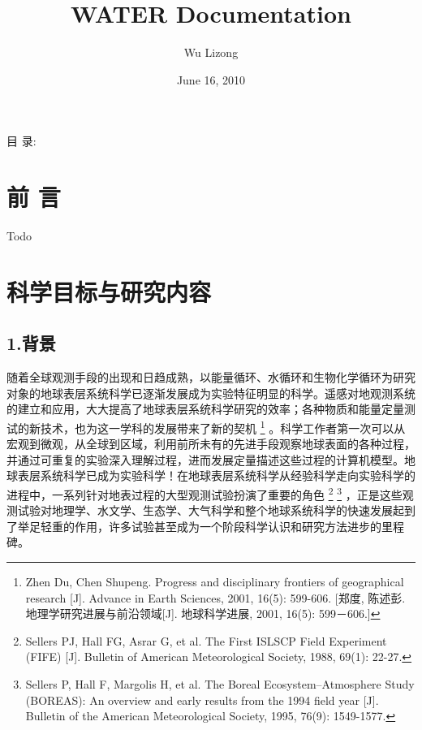 \documentclass[letterpaper,10pt,english]{sphinxmanual}
\title{WATER Documentation}
\date{June 16, 2010}
\author{Wu Lizong}
\begin{document}
\maketitle
\tableofcontents
{}\label{index::doc}


目 录:


\chapter{前  言}
\label{foreword::doc}\label{foreword:foreword}\label{foreword:id1}
Todo


\chapter{科学目标与研究内容}
\label{water_aims:doc-aims}\label{water_aims::doc}\label{water_aims:id1}

\section{1.背景}
\label{water_aims:id2}
随着全球观测手段的出现和日趋成熟，以能量循环、水循环和生物化学循环为研究对象的地球表层系统科学已逐渐发展成为实验特征明显的科学。遥感对地观测系统的建立和应用，大大提高了地球表层系统科学研究的效率；各种物质和能量定量测试的新技术，也为这一学科的发展带来了新的契机 \footnote{
Zhen Du, Chen Shupeng. Progress and disciplinary frontiers of geographical research {[}J{]}. Advance in Earth Sciences, 2001, 16(5): 599-606. {[}郑度, 陈述彭. 地理学研究进展与前沿领域{[}J{]}. 地球科学进展, 2001, 16(5): 599－606.{]}
} 。科学工作者第一次可以从宏观到微观，从全球到区域，利用前所未有的先进手段观察地球表面的各种过程，并通过可重复的实验深入理解过程，进而发展定量描述这些过程的计算机模型。地球表层系统科学已成为实验科学！在地球表层系统科学从经验科学走向实验科学的进程中，一系列针对地表过程的大型观测试验扮演了重要的角色 \footnote{
Sellers PJ, Hall FG, Asrar G, et al. The First ISLSCP Field Experiment (FIFE) {[}J{]}. Bulletin of American Meteorological Society, 1988, 69(1): 22-27.
} \footnote{
Sellers P, Hall F, Margolis H, et al. The Boreal Ecosystem–Atmosphere Study (BOREAS): An overview and early results from the 1994 field year {[}J{]}. Bulletin of the American Meteorological Society, 1995, 76(9): 1549-1577.
} ，正是这些观测试验对地理学、水文学、生态学、大气科学和整个地球系统科学的快速发展起到了举足轻重的作用，许多试验甚至成为一个阶段科学认识和研究方法进步的里程碑。
\end{document}
